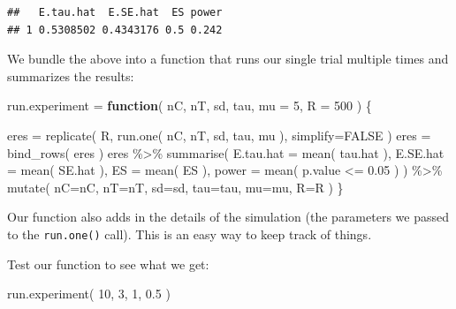 \documentclass[
]{book}
\newenvironment{Shaded}{\begin{snugshade}}{\end{snugshade}}
\newcommand{\AttributeTok}[1]{\textcolor[rgb]{0.77,0.63,0.00}{#1}}
\newcommand{\ConstantTok}[1]{\textcolor[rgb]{0.00,0.00,0.00}{#1}}
\newcommand{\ControlFlowTok}[1]{\textcolor[rgb]{0.13,0.29,0.53}{\textbf{#1}}}
\newcommand{\DecValTok}[1]{\textcolor[rgb]{0.00,0.00,0.81}{#1}}
\newcommand{\FloatTok}[1]{\textcolor[rgb]{0.00,0.00,0.81}{#1}}
\newcommand{\FunctionTok}[1]{\textcolor[rgb]{0.00,0.00,0.00}{#1}}
\newcommand{\NormalTok}[1]{#1}
\newcommand{\OtherTok}[1]{\textcolor[rgb]{0.56,0.35,0.01}{#1}}
\newcommand{\SpecialCharTok}[1]{\textcolor[rgb]{0.00,0.00,0.00}{#1}}
\begin{document}
\begin{verbatim}
##   E.tau.hat  E.SE.hat  ES power
## 1 0.5308502 0.4343176 0.5 0.242
\end{verbatim}

We bundle the above into a function that runs our single trial multiple times and
summarizes the results:

\begin{Shaded}
\begin{Highlighting}[]
\NormalTok{run.experiment }\OtherTok{=} \ControlFlowTok{function}\NormalTok{( nC, nT, sd, tau, }\AttributeTok{mu =} \DecValTok{5}\NormalTok{, }\AttributeTok{R =} \DecValTok{500}\NormalTok{ ) \{}

\NormalTok{  eres }\OtherTok{=} \FunctionTok{replicate}\NormalTok{( R, }\FunctionTok{run.one}\NormalTok{( nC, nT, sd, tau, mu ), }\AttributeTok{simplify=}\ConstantTok{FALSE}\NormalTok{ )}
\NormalTok{  eres }\OtherTok{=} \FunctionTok{bind\_rows}\NormalTok{( eres )}
\NormalTok{  eres }\SpecialCharTok{\%\textgreater{}\%} \FunctionTok{summarise}\NormalTok{( }\AttributeTok{E.tau.hat =} \FunctionTok{mean}\NormalTok{( tau.hat ),}
                      \AttributeTok{E.SE.hat =} \FunctionTok{mean}\NormalTok{( SE.hat ),}
                      \AttributeTok{ES =} \FunctionTok{mean}\NormalTok{( ES ),}
                      \AttributeTok{power =} \FunctionTok{mean}\NormalTok{( p.value }\SpecialCharTok{\textless{}=} \FloatTok{0.05}\NormalTok{ ) ) }\SpecialCharTok{\%\textgreater{}\%}
    \FunctionTok{mutate}\NormalTok{( }\AttributeTok{nC=}\NormalTok{nC, }\AttributeTok{nT=}\NormalTok{nT, }\AttributeTok{sd=}\NormalTok{sd, }\AttributeTok{tau=}\NormalTok{tau, }\AttributeTok{mu=}\NormalTok{mu, }\AttributeTok{R=}\NormalTok{R )}
\NormalTok{\}}
\end{Highlighting}
\end{Shaded}

Our function also adds in the details of the simulation (the parameters we passed
to the \texttt{run.one()} call). This is an easy way to keep track of things.

Test our function to see what we get:

\begin{Shaded}
\begin{Highlighting}[]
\FunctionTok{run.experiment}\NormalTok{( }\DecValTok{10}\NormalTok{, }\DecValTok{3}\NormalTok{, }\DecValTok{1}\NormalTok{, }\FloatTok{0.5}\NormalTok{ )}
\end{Highlighting}
\end{Shaded}
\end{document}
